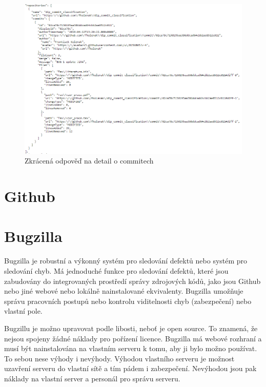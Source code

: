 \documentclass[czech,DP]{thesiskiv}
\begin{document}
\begin{figure}[!ht]
\begin{center}
	\includegraphics[width=1.0\textwidth]{Pic/JIRAresponse.png}
\end{center}
\label{pic:JIRAresponse}
\caption{Zkrácená odpověď na detail o commitech}
\end{figure}

\section{Github}




\section{Bugzilla}
Bugzilla\citep{bugzillabugtracking} je robustní a výkonný systém pro sledování defektů nebo systém pro sledování chyb. Má jednoduché funkce pro sledování defektů, které jsou zabudovány do integrovaných prostředí správy zdrojových kódů, jako jsou Github nebo jiné webové nebo lokálně nainstalované ekvivalenty. Bugzilla umožňuje správu pracovních postupů nebo kontrolu viditelnosti chyb (zabezpečení) nebo vlastní pole.

Bugzillu je možno upravovat podle libosti, neboť je open source. To znamená, že nejsou spojeny žádné náklady pro pořízení licence. Bugzilla má webové rozhraní a musí být nainstalována na vlastním serveru k tomu, aby ji bylo možno používat. To sebou nese výhody i nevýhody. Výhodou vlastního serveru je možnost uzavření serveru do vlastní sítě a tím pádem i zabezpečení. Nevýhodou jsou pak náklady na vlastní server a personál pro správu serveru.
\end{document}
